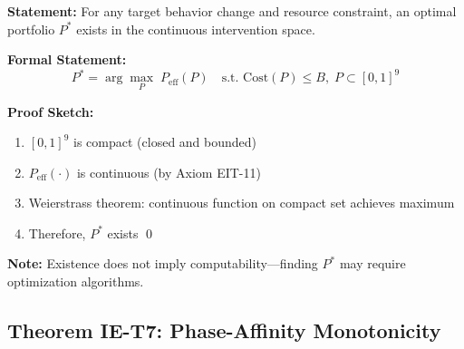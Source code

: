 \begin{tcolorbox}[colback=green!5!white, colframe=green!75!black,
    title=\textbf{Theorem IE-T6: Optimal Portfolio Existence}]

\textbf{Statement:} For any target behavior change and resource constraint, an optimal portfolio $P^*$ exists in the continuous intervention space.

\textbf{Formal Statement:}
\begin{equation}
P^* = \arg\max_P \; P_{\text{eff}}(P) \quad \text{s.t. } \text{Cost}(P) \leq B, \; P \subset [0,1]^9
\end{equation}

\textbf{Proof Sketch:}
\begin{enumerate}[nosep]
    \item $[0,1]^9$ is compact (closed and bounded)
    \item $P_{\text{eff}}(\cdot)$ is continuous (by Axiom EIT-11)
    \item Weierstrass theorem: continuous function on compact set achieves maximum
    \item Therefore, $P^*$ exists \qed
\end{enumerate}

\textbf{Note:} Existence does not imply computability---finding $P^*$ may require optimization algorithms.

\end{tcolorbox}

\subsection{Theorem IE-T7: Phase-Affinity Monotonicity}

